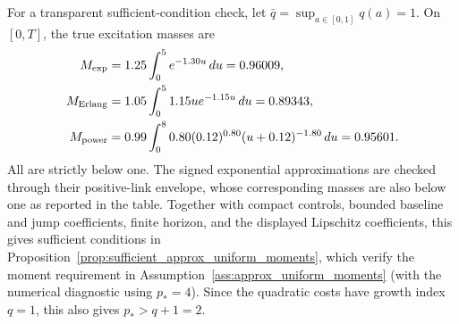 \documentclass[11pt]{article}
\theoremstyle{remarkitalic}
\theoremstyle{remarkitalic}
\newcommand{\1}{\mathbf 1}
\begin{document}
For a transparent sufficient-condition check, let
\(\bar q=\sup_{a\in[0,1]}q(a)=1\). On \([0,T]\), the true excitation masses are
\[
\begin{aligned}
M_{\rm exp}
 &=1.25\int_0^5 e^{-1.30u}\,du=0.96009,\\
M_{\rm Erlang}
 &=1.05\int_0^5 1.15u e^{-1.15u}\,du=0.89343,\\
M_{\rm power}
 &=0.99\int_0^8 0.80(0.12)^{0.80}(u+0.12)^{-1.80}\,du=0.95601.
\end{aligned}
\]
All are strictly below one. The signed exponential approximations are checked
through their positive-link envelope, whose corresponding masses are also
below one as reported in the table. Together with compact controls, bounded
baseline and jump coefficients, finite horizon, and the displayed Lipschitz
coefficients, this gives sufficient conditions in Proposition~\ref{prop:sufficient_approx_uniform_moments}, which verify the
moment requirement in Assumption~\ref{ass:approx_uniform_moments} (with the numerical diagnostic using
\(p_*=4\)). Since the quadratic costs have growth index \(q=1\), this also
gives \(p_*>q+1=2\).
\end{document}
